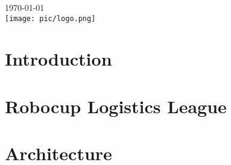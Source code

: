 \documentclass[12pt]{report}
\begin{document}
\begin{titlepage}


{\large \today}\\[2cm] %


\texttt{[image: pic/logo.png]}\\[1cm] %


\vfill %

\end{titlepage}

\tableofcontents
\listoffigures


\begin{abstract}
	
\end{abstract}

\chapter{Introduction}
	

\chapter{Robocup Logistics League}
	

\chapter{Architecture}
    
\end{document}
